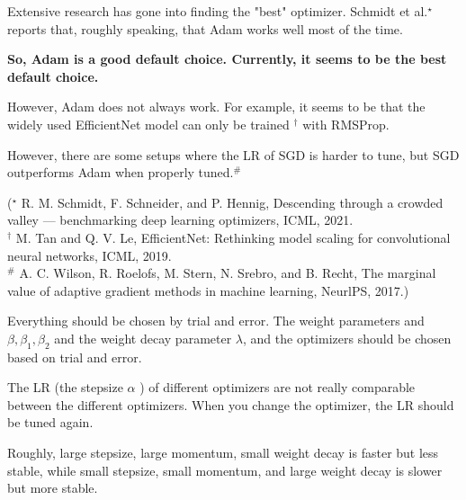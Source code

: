 \documentclass{report}
\begin{document}
\begin{concept}
    Extensive research has gone into finding the "best" optimizer. Schmidt et al.${ }^{\star}$ reports that, roughly speaking, that Adam works well most of the time.

    \textbf{So, Adam is a good default choice. Currently, it seems to be the best default choice.}

    However, Adam does not always work. For example, it seems to be that the widely used EfficientNet model can only be trained ${ }^{\dagger}$ with RMSProp.

    However, there are some setups where the LR of SGD is harder to tune, but SGD outperforms Adam when properly tuned.${ }^{\#}$

    (${ }^{\star}$ R. M. Schmidt, F. Schneider, and P. Hennig, Descending through a crowded valley — benchmarking deep learning optimizers, ICML, 2021.\\
    ${ }^{\dagger}$ M. Tan and Q. V. Le, EfficientNet: Rethinking model scaling for convolutional neural networks, ICML, 2019.\\
    ${ }^{\#}$ A. C. Wilson, R. Roelofs, M. Stern, N. Srebro, and B. Recht, The marginal value of adaptive gradient methods in machine learning, NeurlPS, 2017.)
\end{concept}

\begin{concept}
    Everything should be chosen by trial and error. The weight parameters and $\beta, \beta_{1}, \beta_{2}$ and the weight decay parameter $\lambda$, and the optimizers should be chosen based on trial and error.

    The LR (the stepsize $\alpha$ ) of different optimizers are not really comparable between the different optimizers. When you change the optimizer, the LR should be tuned again.

    Roughly, large stepsize, large momentum, small weight decay is faster but less stable, while small stepsize, small momentum, and large weight decay is slower but more stable.
\end{concept}
\end{document}
